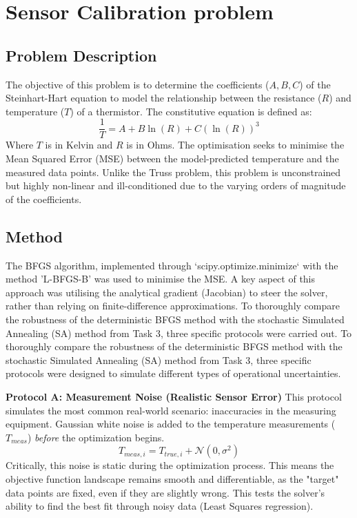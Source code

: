 \section{Sensor Calibration problem}

\subsection{Problem Description}
The objective of this problem is to determine the coefficients ($A, B, C$) of the Steinhart-Hart equation to model the relationship between the resistance ($R$) and temperature ($T$) of a thermistor. The constitutive equation is defined as:
\begin{equation}
\frac{1}{T} = A + B \ln(R) + C (\ln(R))^3
\end{equation}
Where $T$ is in Kelvin and $R$ is in Ohms. The optimisation seeks to minimise the Mean Squared Error (MSE) between the model-predicted temperature and the measured data points. Unlike the Truss problem, this problem is unconstrained but highly non-linear and ill-conditioned due to the varying orders of magnitude of the coefficients.

\subsection{Method}
The BFGS algorithm, implemented through `scipy.optimize.minimize` with the method 'L-BFGS-B' was used to minimise the MSE. A key aspect of this approach was utilising the analytical gradient (Jacobian) to steer the solver, rather than relying on finite-difference approximations.
To thoroughly compare the robustness of the deterministic BFGS method with the stochastic Simulated Annealing (SA) method from Task 3, three specific protocols were carried out.
To thoroughly compare the robustness of the deterministic BFGS method with the stochastic Simulated Annealing (SA) method from Task 3, three specific protocols were designed to simulate different types of operational uncertainties.

\textbf{Protocol A: Measurement Noise (Realistic Sensor Error)}
This protocol simulates the most common real-world scenario: inaccuracies in the measuring equipment. Gaussian white noise is added to the temperature measurements ($T_{meas}$) \textit{before} the optimization begins.
\begin{equation}
T_{meas, i} = T_{true, i} + \mathcal{N}(0, \sigma^2)
\end{equation}
Critically, this noise is static during the optimization process. This means the objective function landscape remains smooth and differentiable, as the "target" data points are fixed, even if they are slightly wrong. This tests the solver's ability to find the best fit through noisy data (Least Squares regression).

